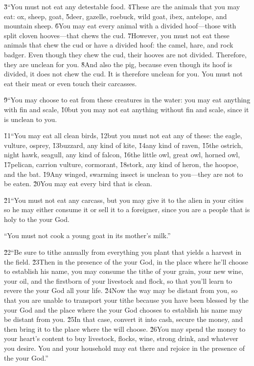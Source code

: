 \v{3}``You must not eat any detestable food. \v{4}These are the animals that you may eat: ox, sheep, goat, \v{5}deer, gazelle, roebuck, wild goat, ibex, antelope, and mountain sheep. \v{6}You may eat every animal with a divided hoof---those with split cloven hooves---that chews the cud. \v{7}However, you must not eat these animals that chew the cud or have a divided hoof: the camel, hare, and rock badger. Even though they chew the cud, their hooves are not divided. Therefore, they are unclean for you. \v{8}And also the pig, because even though its hoof is divided, it does not chew the cud. It is therefore unclean for you. You must not eat their meat or even touch their carcasses.

\v{9}``You may choose to eat from these creatures in the water: you may eat anything with fin and scale, \v{10}but you may not eat anything without fin and scale, since it is unclean to you.

\v{11}``You may eat all clean birds, \v{12}but you must not eat any of these: the eagle, vulture, osprey, \v{13}buzzard, any kind of kite, \v{14}any kind of raven, \v{15}the ostrich, night hawk, seagull, any kind of falcon, \v{16}the little owl, great owl, horned owl, \v{17}pelican, carrion vulture, cormorant, \v{18}stork, any kind of heron, the hoopoe, and the bat. \v{19}Any winged, swarming insect is unclean to you---they are not to be eaten. \v{20}You may eat every bird that is clean.

\v{21}``You must not eat any carcass, but you may give it to the alien in your cities so he may either consume it or sell it to a foreigner, since you are a people that is holy to the  your God.

``You must not cook a young goat in its mother's milk.''

\v{22}``Be sure to tithe annually from everything you plant that yields a harvest in the field. \v{23}Then in the presence of the  your God, in the place where he'll choose to establish his name, you may consume the tithe of your grain, your new wine, your oil, and the firstborn of your livestock and flock, so that you'll learn to revere the  your God all your life. \v{24}Now the way may be distant from you, so that you are unable to transport your tithe because you have been blessed by the  your God and the place where the  your God chooses to establish his name may be distant from you. \v{25}In that case, convert it into cash, secure the money, and then bring it to the place where the  will choose. \v{26}You may spend the money to your heart's content to buy livestock, flocks, wine, strong drink, and whatever you desire. You and your household may eat there and rejoice in the presence of the  your God.''

